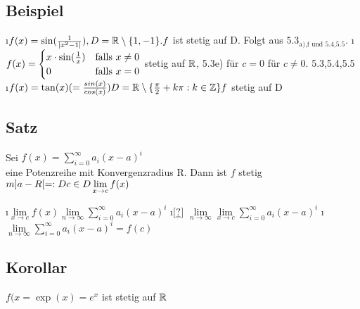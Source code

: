 \subsection{Beispiel}
\begin{enumerate}[a)]
\i $f(x) = \sin(\frac{1}{\lvert x^2-1 \rvert}), D = \mathbb{R} \setminus \{1,-1 \}.
f$ ist stetig auf D.
Folgt aus $5.3_{\text{a),f und 5.4,5.5}}$.
\i $f(x) = \begin{cases}
x \cdot \sin(\frac{1}{x}) &\text{falls } x \neq 0\\
0 &\text{falls } x = 0 
\end{cases}$
stetig auf $\mathbb{R}$,
5.3e) für $c = 0$ für $c \neq 0$. 5.3,5.4,5.5
\i $f(x) = \tan(x) (= \frac{sin(x)}{cos(x)})\\
D = \mathbb{R} \setminus \{\frac{\pi}{2}+ k\pi: k \in \mathbb{Z} \}
f$ stetig auf D
\end{enumerate}
\subsection[Satz: Stetigkeit von Potenzreihen]{Satz}
Sei $f(x) = \sum\limits_{i=0}^{\infty} a_i (x-a)^i$\\
eine Potenzreihe mit Konvergenzradius R. Dann ist $f$ stetig $m]a-R[ =: D\\
c \in D
\lim\limits_{x \rightarrow c} f(x)$
\begin{enumerate}[=]
\i$ \lim\limits_{x \rightarrow c} f(x) \lim\limits_{n \rightarrow \infty} \sum\limits_{i=0}^{\infty} a_i (x-a)^i$
\i[$\underset{=}{?}$] $ \lim\limits_{n \rightarrow \infty} \lim\limits_{x \rightarrow c} \sum\limits_{i=0}^{\infty} a_i (x-a)^i$ 
\i $ \lim\limits_{n \rightarrow \infty} \sum\limits_{i=0}^{\infty} a_i (x-a)^i = f(c)$
\end{enumerate}
\subsection{Korollar}\label{sec:5.8}
$f(x = \exp(x) = e^x$ ist stetig auf $\mathbb{R}$
